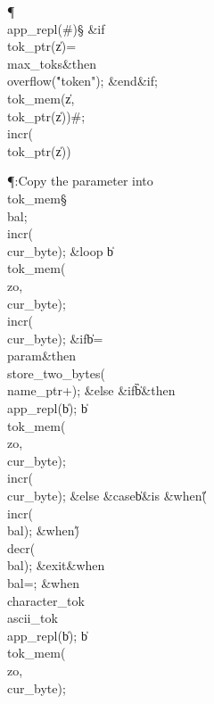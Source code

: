 \Y\P\4\D\\{app\_repl}\?\1(\?\#\?\2)\S\?\6
\&{if}\1\1\8\\{tok\_ptr}\?\1(\?\|z\?\2)=\?\\{max\_toks}\2\8\&{then}\6
\\{overflow}\?\1(\?\.{"token"}\?\2)\?;\2\6
\&{end}\8\2\&{if}\1;\6
\\{tok\_mem}\?\1(\?\|z\?,\?\\{tok\_ptr}\?\1(\?\|z\?\2)\2)\K\?\#;\5
\\{incr}\?\1(\?\\{tok\_ptr}\?\1(\?\|z\?\2)\2)\?\par
\Y\P\?\4:Copy the parameter into \\{tok\_mem}\X\S\?\6
\\{bal}\?\K{};\5
\\{incr}\?\1(\?\\{cur\_byte}\?\2)\?;\6
\1\&{loop}\6
\|b\?\K\?\\{tok\_mem}\?\1(\?\\{zo}\?,\?\\{cur\_byte}\?\2)\?;\5
\\{incr}\?\1(\?\\{cur\_byte}\?\2)\?;\6
\&{if}\1\1\8\|b\?=\?\\{param}\2\8\&{then}\6
\\{store\_two\_bytes}\?\1(\?\\{name\_ptr}\?+\2)\?;\6
\4\&{else}\6
\&{if}\1\1\8\|b\?\G{}\?\2\8\&{then}\6
\\{app\_repl}\?\1(\?\|b\?\2)\?;\5
\|b\?\K\?\\{tok\_mem}\?\1(\?\\{zo}\?,\?\\{cur\_byte}\?\2)\?;\5
\\{incr}\?\1(\?\\{cur\_byte}\?\2)\?;\6
\4\&{else}\6
\&{case}\1\8\|b\1\8\&{is}\8\6
\4\&{when}\8\H{(}\KR\6
\\{incr}\?\1(\?\\{bal}\?\2)\?;\6
\4\&{when}\8\H{)}\KR\6
\\{decr}\?\1(\?\\{bal}\?\2)\?;\5
\?\&{exit}\8\&{when}\?\8\\{bal}\?=;\6
\4\&{when}\8\\{character\_tok}\?\mathrel{\.|}\?\\{ascii\_tok}\KR\6
\\{app\_repl}\?\1(\?\|b\?\2)\?;\5
\|b\?\K\?\\{tok\_mem}\?\1(\?\\{zo}\?,\?\\{cur\_byte}\?\2)\?;\5
